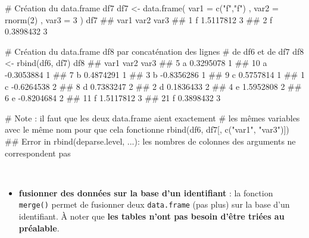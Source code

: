 \documentclass[12pt,twosided, notitlepage]{book}
\newenvironment{Shaded}{}{}
\newcommand{\KeywordTok}[1]{\textcolor[rgb]{0.00,0.00,1.00}{#1}}
\newcommand{\DataTypeTok}[1]{#1}
\newcommand{\DecValTok}[1]{#1}
\newcommand{\StringTok}[1]{\textcolor[rgb]{0.00,0.50,0.50}{#1}}
\newcommand{\CommentTok}[1]{\textcolor[rgb]{0.00,0.50,0.00}{#1}}
\newcommand{\NormalTok}[1]{#1}
\providecommand{\tightlist}{%
  \setlength{\itemsep}{0pt}\setlength{\parskip}{0pt}}
\renewenvironment{Shaded}{\begin{snugshade}}{\end{snugshade}}
\begin{document}
\begin{Shaded}
\begin{Highlighting}[]
\CommentTok{# Création du data.frame df7}
\NormalTok{df7 <-}\StringTok{ }\KeywordTok{data.frame}\NormalTok{(}
  \DataTypeTok{var1 =} \KeywordTok{c}\NormalTok{(}\StringTok{"f"}\NormalTok{,}\StringTok{"f"}\NormalTok{)}
\NormalTok{  , }\DataTypeTok{var2 =} \KeywordTok{rnorm}\NormalTok{(}\DecValTok{2}\NormalTok{)}
\NormalTok{  , }\DataTypeTok{var3 =} \DecValTok{3}
\NormalTok{)}
\NormalTok{df7}
\NormalTok{  ##   var1      var2 var3}
\NormalTok{  ## 1    f 1.5117812    3}
\NormalTok{  ## 2    f 0.3898432    3}

\CommentTok{# Création du data.frame df8 par concaténation des lignes }
\CommentTok{# de df6 et de df7}
\NormalTok{df8 <-}\StringTok{ }\KeywordTok{rbind}\NormalTok{(df6, df7)}
\NormalTok{df8}
\NormalTok{  ##    var1       var2 var3}
\NormalTok{  ## 5     a  0.3295078    1}
\NormalTok{  ## 10    a -0.3053884    1}
\NormalTok{  ## 7     b  0.4874291    1}
\NormalTok{  ## 3     b -0.8356286    1}
\NormalTok{  ## 9     c  0.5757814    1}
\NormalTok{  ## 1     c -0.6264538    2}
\NormalTok{  ## 8     d  0.7383247    2}
\NormalTok{  ## 2     d  0.1836433    2}
\NormalTok{  ## 4     e  1.5952808    2}
\NormalTok{  ## 6     e -0.8204684    2}
\NormalTok{  ## 11    f  1.5117812    3}
\NormalTok{  ## 21    f  0.3898432    3}

\CommentTok{# Note : il faut que les deux data.frame aient exactement}
\CommentTok{# les mêmes variables avec le même nom pour que cela fonctionne}
\KeywordTok{rbind}\NormalTok{(df6, df7[, }\KeywordTok{c}\NormalTok{(}\StringTok{"var1"}\NormalTok{, }\StringTok{"var3"}\NormalTok{)])}
\NormalTok{  ## Error in rbind(deparse.level, ...): les nombres de colonnes des arguments ne correspondent pas}
\end{Highlighting}
\end{Shaded}

~

\begin{itemize}
\tightlist
\item
  \textbf{fusionner des données sur la base d'un identifiant} : la
  fonction \texttt{merge()} permet de
  fusionner deux \texttt{data.frame} (pas plus) sur la base d'un
  identifiant. À noter que \textbf{les tables n'ont pas besoin d'être
  triées au préalable}.
\end{itemize}
\end{document}
